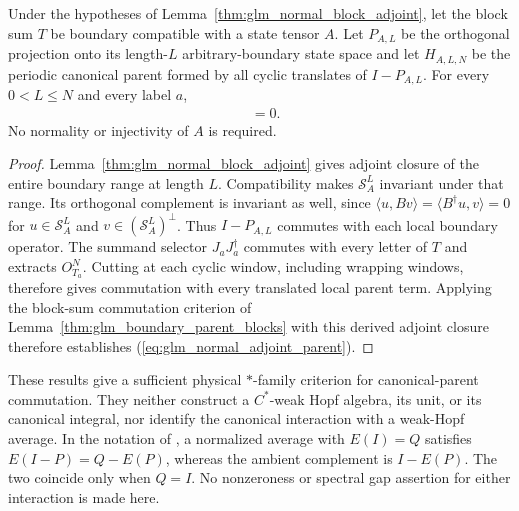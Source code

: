 \begin{lemma}
    \label{thm:glm_normal_adjoint_parent}
    \leanok
    Under the hypotheses of Lemma~\ref{thm:glm_normal_block_adjoint},
    let the block sum $T$ be boundary compatible with a state
    tensor $A$. Let $P_{A,L}$ be the orthogonal projection onto its
    length-$L$ arbitrary-boundary state space and let $H_{A,L,N}$ be the
    periodic canonical parent formed by all cyclic translates of
    $I-P_{A,L}$. For every $0<L\leq N$ and every label $a$,
    \begin{align}
        [H_{A,L,N},O^N_{T_a}] & =0.
        \label{eq:glm_normal_adjoint_parent}
    \end{align}
    No normality or injectivity of $A$ is required.
\end{lemma}
\begin{proof}\leanok
    Lemma~\ref{thm:glm_normal_block_adjoint} gives adjoint closure of
    the entire boundary range at length $L$. Compatibility makes
    $\mathcal S_A^L$ invariant under that range. Its orthogonal
    complement is invariant as well, since
    $\langle u,Bv\rangle=\langle B^\dagger u,v\rangle=0$ for
    $u\in\mathcal S_A^L$ and $v\in(\mathcal S_A^L)^\perp$.
    Thus $I-P_{A,L}$ commutes with each local boundary operator.
    The summand selector $J_aJ_a^\dagger$ commutes with every letter of
    $T$ and extracts $O^N_{T_a}$. Cutting at each cyclic window, including
    wrapping windows, therefore gives commutation with every translated
    local parent term. Applying the block-sum commutation criterion of
    Lemma~\ref{thm:glm_boundary_parent_blocks} with this derived adjoint
    closure therefore establishes (\ref{eq:glm_normal_adjoint_parent}).
\end{proof}

These results give a sufficient physical $*$-family criterion for
canonical-parent commutation. They neither construct a $C^*$-weak Hopf
algebra, its unit, or its canonical integral, nor identify the canonical
interaction with a weak-Hopf average. In the notation of
\cite[Appendix~B]{GarreRubio2023MPOSym}, a normalized average with
$E(I)=Q$ satisfies $E(I-P)=Q-E(P)$, whereas the ambient complement is
$I-E(P)$. The two coincide only when $Q=I$. No nonzeroness or spectral
gap assertion for either interaction is made here.

